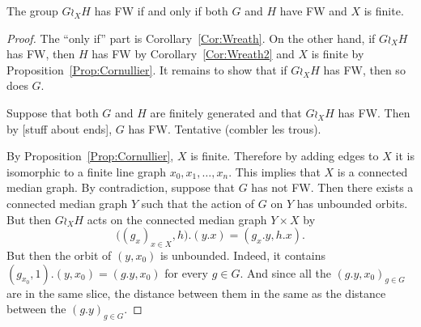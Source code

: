 \begin{thm}[L-S]
The group $G\wr_X H$ has FW if and only if both $G$ and $H$ have FW and $X$ is finite.
\end{thm}
\begin{proof}
The ``only if'' part is Corollary~\ref{Cor:Wreath}.
On the other hand, if $G\wr_X H$ has FW, then $H$ has FW by Corollary~\ref{Cor:Wreath2} and $X$ is finite by Proposition~\ref{Prop:Cornullier}.
It remains to show that if $G\wr_X H$ has FW, then so does $G$.

Suppose that both $G$ and $H$ are finitely generated and that $G\wr_X H$ has FW. Then by [stuff about ends], $G$ has FW.
Tentative (combler les trous).

By Proposition~\ref{Prop:Cornullier}, $X$ is finite. Therefore by adding edges to $X$ it is isomorphic to a finite line graph $x_0,x_1,\dots, x_n$. This implies that $X$ is a connected median graph.
By contradiction, suppose that $G$ has not FW.
Then there exists a connected median graph $Y$ such that the action of $G$ on $Y$ has unbounded orbits.
But then $G\wr_X H$ acts on the connected median graph $Y\times X$ by
\[
	\bigl((g_x)_{x\in X},h\bigr).(y.x)=(g_x.y,h.x).
\]
But then the orbit of $(y,x_0)$ is unbounded.
Indeed, it contains $(g_{x_0},1).(y,x_0)=(g.y,x_0)$ for every $g\in G$. And since all the $(g.y,x_0)_{g\in G}$ are in the same slice, the distance between them in the same as the distance between the $(g.y)_{g\in G}$.

\end{proof}